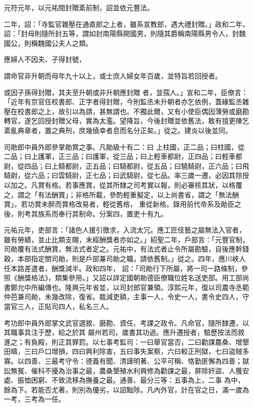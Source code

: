 \begin{pinyinscope}
 元符元年，以元祐間封贈紊前制，詔並依元豐法。



 二年，詔：「寺監官雜壓在通直郎之上者，雖系宣教郎，遇大禮封贈。」政和二年，詔：「封母則隨所封五等，謂如封南陽縣開國男，則隨其爵稱南陽縣男令人，封魏國公，則稱魏國公夫人之類。



 應婦人不因夫、子得封號，



 謂命官非升朝而母年九十以上，或士庶人婦女年百歲，並特旨若回授者。



 或因子孫得封贈，其夫至升朝或非升朝應封贈
 者，並孺人。」宣和二年，臣僚言：「近年有京官任校書郎、正字者得封贈，今則監丞未升朝者亦乞依例，蓋緣監丞雜壓在校書郎之上，故引以為請，甚無謂也。不獨此爾，又有小使臣偶因薄勞或磨勘轉官，遂乞回授封贈父母，實為太濫。望降旨，今後封贈並依舊法，敢有擅更陳乞紊亂典章者，置之典刑，庶幾僥幸者息而名分正矣。」從之。建炎以後並同。



 司勛郎中員外郎參掌勛賞之事。凡勛級十有二：曰
 上柱國，正二品；曰柱國，從二品；曰上護軍，正三品；曰護軍，從三品；曰上輕車都尉，正四品；曰輕車都尉，從四品；曰上騎都尉，正五品；曰騎都尉，從五品；曰驍騎尉，正六品；曰飛騎尉，從六品；曰雲騎尉，正七品；曰武騎尉，從七品。率三歲一遷，必因其除授以加之。凡賞有格。若事應賞，從其所隸之司考實以報，則必審核其狀，以格覆之，謂之「有法酬賞」；非格所載，參酌輕重擬定，以上尚書省，謂之「無法酬賞」。若功賞未醉而賞格改易者，輕從舊格，
 重從新格。錄用前代帝系及勛臣之後，則考其族系而奉行其制命。分案四，置吏十有九。



 元祐元年，吏部言：「諸色人援引徼求，入流太冗。應工匠伎藝之屬無法入官者，雖有勞績，並止比類支賜，未經酬獎者亦如之。」紹聖二年，戶部言：「元豐官制，司勛覆有法式酬賞，無法式者定之。元祐中，有法式者止令所屬勘驗，自後應幹錢穀，本部指定關司勛，則是戶部兼司勛之職，請依舊制。」從之。四年，應川峽人任本路差遣者，酬獎減半。政和四年，
 詔：「司勛行下所屬，將一司一路條制，參照《酬獎格法》，類集參用。」又詔以詳定國朝勛德臣僚職位姓名送吏部。用工部尚書鄭允中所編傳也。隆興元年省並，以司封郎官兼領。淳熙元年，復以司農寺丞範仲芭兼司勛，未幾改除，復省。裁減吏額，主事一人，令史一人，書令史四人，守當官三人，正貼司四人，私名三人。



 考功郎中員外郎掌文武官選敘、磨勘、資任、考課之政令。凡命官，隨所隸遷，以其職事具注于歷，給之於其
 屬州若司，歲書其功過。應升遷授者，驗歷按法而敘進之；有負殿，則正其罪罰。以七事考監司：一曰舉官當否，二曰勸課農桑、增墾田疇，三曰戶口增損，四曰興利除害，五曰事失案察，六曰較正刑獄，七曰盜賊多寡。以四善、三最考守令：德義有聞、清謹明著、公平可稱、恪勤匪懈為四善；獄訟無冤、催科不擾為治事之最，農桑墾殖水利興修為勸課之最，屏除奸盜、人獲安處、振恤困窮、不致流移為撫養之最。通善、最分三等：五事為上，二事
 為中，餘為下。若能否尤著，則別為優劣，以詔黜陟。凡內外官，計在官之日，滿一歲為一考，三考為一任。




\end{pinyinscope}
